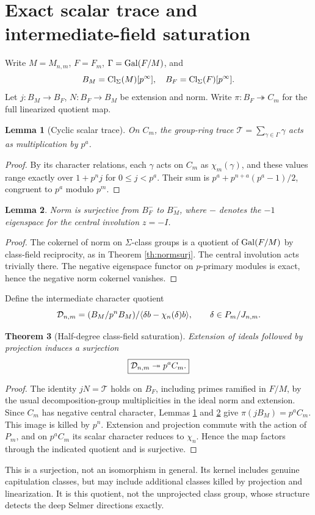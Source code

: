\documentclass[11pt,a4paper]{article}
\newtheorem{theorem}{Theorem}[section]
\newtheorem{lemma}[theorem]{Lemma}
\theoremstyle{definition}\newtheorem{definition}[theorem]{Definition}
\theoremstyle{remark}\newtheorem{remark}[theorem]{Remark}
\numberwithin{equation}{section}
\begin{document}
\section{Exact scalar trace and intermediate-field saturation}
Write $M=M_{n,m}$, $F=F_m$, $\Gamma=\operatorname{Gal}(F/M)$, and
\[
B_M=\operatorname{Cl}_\Sigma(M)[p^\infty],\quad B_F=\operatorname{Cl}_\Sigma(F)[p^\infty].
\]
Let $j:B_M\to B_F$, $N:B_F\to B_M$ be extension and norm. Write $\pi:B_F\twoheadrightarrow C_m$ for the full linearized quotient map.
\begin{lemma}[Cyclic scalar trace]\label{lem:trace}
On $C_m$, the group-ring trace $\mathcal T=\sum_{\gamma\in\Gamma}\gamma$ acts as multiplication by $p^a$.
\end{lemma}
\begin{proof}
By its character relations, each $\gamma$ acts on $C_m$ as $\chi_m(\gamma)$, and these values range exactly over $1+p^n j$ for $0\le j<p^a$. Their sum is $p^a+p^{n+a}(p^a-1)/2$, congruent to $p^a$ modulo $p^m$.
\end{proof}
\begin{lemma}\label{lem:neg}
Norm is surjective from $B_F^-$ to $B_M^-$, where $-$ denotes the $-1$ eigenspace for the central involution $z=-I$.
\end{lemma}
\begin{proof}
The cokernel of norm on $\Sigma$-class groups is a quotient of $\operatorname{Gal}(F/M)$ by class-field reciprocity, as in Theorem \ref{th:normsurj}. The central involution acts trivially there. The negative eigenspace functor on $p$-primary modules is exact, hence the negative norm cokernel vanishes.\end{proof}
Define the intermediate character quotient
\[
\mathcal D_{n,m}=(B_M/p^nB_M)/\langle\delta b-\chi_n(\delta)b\rangle,
\qquad \delta\in P_m/J_{n,m}.
\]
\begin{theorem}[Half-degree class-field saturation]\label{th:half}
Extension of ideals followed by projection induces a surjection
\begin{equation}\label{eq:half}
\boxed{\mathcal D_{n,m}\twoheadrightarrow p^a C_m.}
\end{equation}
\end{theorem}
\begin{proof}
The identity $jN=\mathcal T$ holds on $B_F$, including primes ramified in $F/M$, by the usual decomposition-group multiplicities in the ideal norm and extension. Since $C_m$ has negative central character, Lemmas \ref{lem:trace} and \ref{lem:neg} give $\pi(jB_M)=p^aC_m$. This image is killed by $p^n$. Extension and projection commute with the action of $P_m$, and on $p^a C_m$ its scalar character reduces to $\chi_n$. Hence the map factors through the indicated quotient and is surjective.\end{proof}
This is a surjection, not an isomorphism in general. Its kernel includes genuine capitulation classes, but may include additional classes killed by projection and linearization. It is this quotient, not the unprojected class group, whose structure detects the deep Selmer directions exactly.
\end{document}
